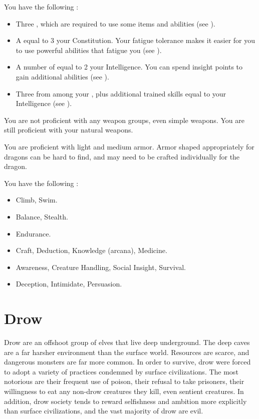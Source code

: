  You have the following :
\begin{itemize}
	\item Three , which are required to use some items and abilities (see ).
	\item A  equal to 3 \add your Constitution.
	      Your fatigue tolerance makes it easier for you to use powerful abilities that fatigue you (see ).
	\item A number of  equal to 2 \add your Intelligence.
	      You can spend insight points to gain additional abilities (see ).
	\item Three  from among your , plus additional trained skills equal to your Intelligence (see ).
\end{itemize}

You are not proficient with any weapon groups, even simple weapons.
You are still proficient with your natural weapons.

You are proficient with light and medium armor.
Armor shaped appropriately for dragons can be hard to find, and may need to be crafted individually for the dragon.

You have the following :
\begin{itemize}
	\item {} Climb, Swim.
	\item {} Balance, Stealth.
	\item {} Endurance.
	\item {} Craft, Deduction, Knowledge (arcana), Medicine.
	\item {} Awareness, Creature Handling, Social Insight, Survival.
	\item {} Deception, Intimidate, Persuasion.
\end{itemize}

\section{Drow}

Drow are an offshoot group of elves that live deep underground.
The deep caves are a far harsher environment than the surface world.
Resources are scarce, and dangerous monsters are far more common.
In order to survive, drow were forced to adopt a variety of practices condemned by surface civilizations.
The most notorious are their frequent use of poison, their refusal to take prisoners, their willingness to eat any non-drow creatures they kill, even sentient creatures.
In addition, drow society tends to reward selfishness and ambition more explicitly than surface civilizations, and the vast majority of drow are evil.

